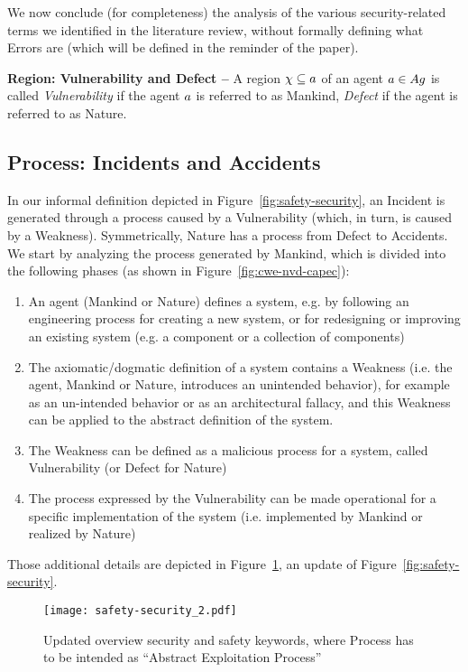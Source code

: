 We now conclude (for completeness) the analysis of the various security-related terms we identified
in the literature review, without formally defining what Errors are (which will be defined
in the reminder of the paper).

\begin{definition}{\bf Region: Vulnerability and Defect --}\label{def:vulnerability-defect}
A region $\chi\subseteq a$ of an agent $a\in Ag$ is
	called \emph{Vulnerability} if the agent $a$ is referred to as Mankind, 
	\emph{Defect} if the agent is referred to as Nature.
\end{definition}

\subsection{Process: Incidents and Accidents}\label{sec:incidentaccident}
In our informal definition depicted in Figure~\ref{fig:safety-security}, an
Incident is generated through a process caused by a Vulnerability (which,
in turn, is caused by a Weakness). Symmetrically, Nature has a process from Defect
to Accidents. We start by analyzing the process generated by Mankind, which is
divided into the following phases (as shown in Figure~\ref{fig:cwe-nvd-capec}):
\begin{enumerate}
	\item An agent (Mankind or Nature) defines a system, e.g. by following
		an engineering process for creating a new system, or for
		redesigning or improving an existing system (e.g. a component
		or a collection of components) 
	\item The axiomatic/dogmatic definition of a system contains a Weakness (i.e.
		the agent, Mankind or Nature, introduces an unintended
		behavior), for example as an un-intended behavior or as an
		architectural fallacy, and this Weakness can be applied to the
		abstract definition of the system.
	\item The Weakness can be defined as a malicious process for a system,
		called Vulnerability (or Defect for Nature)
	\item The process expressed by the Vulnerability can be made
		operational for a specific implementation of the system (i.e.
		implemented by Mankind or realized by Nature) 
\end{enumerate}
Those additional details are depicted in Figure~\ref{fig:safety-security_2}, an update
of Figure~\ref{fig:safety-security}.

\begin{figure}[t]
	\centering
	\texttt{[image: safety-security\_2.pdf]}
	\caption{Updated overview security and safety keywords, where Process
	has to be intended as ``Abstract Exploitation Process''}
	\label{fig:safety-security_2}
\end{figure}

